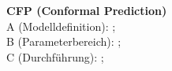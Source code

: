 \begin{otherlanguage}{ngerman}
{\begin{minipage}[t]{\textwidth}
\textbf{CFP (Conformal Prediction)}\\
A (Modelldefinition): \parencite{angelopoulos2021gentle}; \parencite{shafer2008tutorial} \\
B (Parameterbereich): \parencite[S.~63–65]{shafer2008tutorial}; \parencite{vovk2005algorithmic} \\
C (Durchführung): \parencite{angelopoulos2021gentle}; \parencite{shafer2008tutorial}
\end{minipage}%
}


\pagebreak





















\end{otherlanguage}
